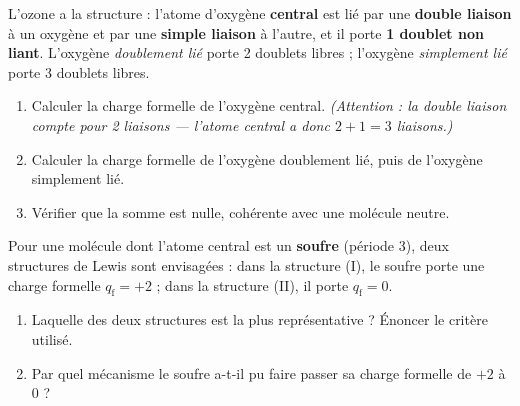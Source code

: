 \documentclass[11pt,a4paper]{article}
\begin{document}
\begin{exo}
L'ozone a la structure  : l'atome d'oxygène \textbf{central} est lié par une
\textbf{double liaison} à un oxygène et par une \textbf{simple liaison} à l'autre, et il porte
\textbf{1 doublet non liant}. L'oxygène \emph{doublement lié} porte 2 doublets libres ; l'oxygène
\emph{simplement lié} porte 3 doublets libres.
\begin{enumerate}[label=\alph*),leftmargin=2em,itemsep=1pt]
  \item Calculer la charge formelle de l'oxygène central. \emph{(Attention : la double liaison
        compte pour 2 liaisons — l'atome central a donc $2+1 = 3$ liaisons.)}
  \item Calculer la charge formelle de l'oxygène doublement lié, puis de l'oxygène simplement lié.
  \item Vérifier que la somme est nulle, cohérente avec une molécule neutre.
\end{enumerate}
\end{exo}

\begin{exo}
Pour une molécule dont l'atome central est un \textbf{soufre} (période 3), deux structures de Lewis
sont envisagées : dans la structure (I), le soufre porte une charge formelle $q_{\mathrm{f}} = +2$ ;
dans la structure (II), il porte $q_{\mathrm{f}} = 0$.
\begin{enumerate}[label=\alph*),leftmargin=2em,itemsep=1pt]
  \item Laquelle des deux structures est la plus représentative ? Énoncer le critère utilisé.
  \item Par quel mécanisme le soufre a-t-il pu faire passer sa charge formelle de $+2$ à $0$ ?
\end{enumerate}
\end{exo}
\end{document}

